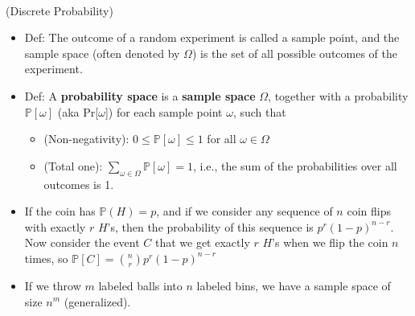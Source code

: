 \documentclass{article}
\begin{document}
 \\
(Discrete Probability)
\begin{itemize}
	\item Def: The outcome of a random experiment is called a sample point, and the sample space (often denoted by $\Omega$) is the set of all possible outcomes of the experiment.
	\item Def: A \textbf{probability space} is a \textbf{sample space} $\Omega$, together with a probability $\mathbb{P}[\omega]$ (aka Pr[$\omega$]) for each sample point $\omega$, such that
	\begin{itemize}
		\item (Non-negativity): $0\leq\mathbb{P}[\omega]\leq1$ for all $\omega\in\Omega$
		\item (Total one): $\sum\limits_{\omega\in\Omega} \mathbb{P}[\omega] = 1$, i.e., the sum of the probabilities over all outcomes is 1.
	\end{itemize}
	\item If the coin has $\mathbb{P}(H) = p$, and if we consider any sequence of $n$ coin flips with exactly $r$ $H$'s, then the probability of this sequence is $p^r (1-p)^{n-r}$. Now consider the event $C$ that we get exactly $r$ $H$’s when we flip the coin $n$ times, so $\mathbb{P}[C] = \binom{n}{r} p^r (1-p)^{n-r}$
	\item If we throw $m$ labeled balls into $n$ labeled bins, we have a sample space of size $n^m$ (generalized).
\end{itemize}
\end{document}
